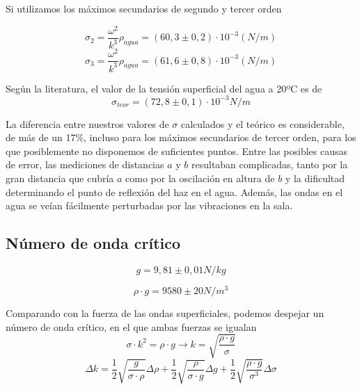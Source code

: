 \documentclass[a4paper,12pt,spanish]{article}
\begin{document}
	
	
	Si utilizamos los máximos secundarios de segundo y tercer orden
	
	\[ \sigma_2 = \frac{\omega^2}{k^3}\rho_{agua} = (60,3\pm 0,2)\cdot 10^{-3} \si{(N/m)} %
	\]
	\[ \sigma_3 = \frac{\omega^2}{k^3}\rho_{agua} = (61,6\pm 0,8)\cdot 10^{-3} \si{(N/m)} 
	\]
	
	
	
	
	
	Según la literatura, el valor de la tensión superficial del agua a 20ºC es de 
	\[\sigma_{teor} = (72,8\pm 0,1)\cdot 10^{-3} \si{N/m} \]
	
	La diferencia entre nuestros valores de $\sigma$ calculados y el teórico es considerable, de más de un 17\%, incluso para los máximos secundarios de tercer orden, para los que posiblemente no disponemos de suficientes puntos. Entre las posibles causas de error, las mediciones de distancias $a$ y $b$ resultaban complicadas, tanto por la gran distancia que cubría $a$ como por la oscilación en altura de $b$ y la dificultad determinando el punto de reflexión del haz en el agua. Además, las ondas en el agua se veían fácilmente perturbadas por las vibraciones en la sala. 
	
	
	
	
	
	
	\subsection*{Número de onda crítico}
	
	\[g = 9,81\pm0,01 \si{N/kg}\]
	
	\[\rho \cdot g = 9580\pm 20\si{N/m^3}\]
	
	Comparando con la fuerza de las ondas superficiales, podemos despejar un número de onda crítico, en el que ambas fuerzas se igualan
	\[ \sigma \cdot k^2 = \rho \cdot g \longrightarrow k = \sqrt{\frac{\rho \cdot g}{\sigma}}
	\]
	\[ \Delta k = \frac{1}{2}\sqrt{\frac{g}{\sigma \cdot \rho}} \Delta \rho +  \frac{1}{2}\sqrt{\frac{\rho}{\sigma \cdot g}} \Delta g + \frac{1}{2}\sqrt{\frac{\rho \cdot g}{\sigma^3}} \Delta\sigma
	\]
	
\end{document}
